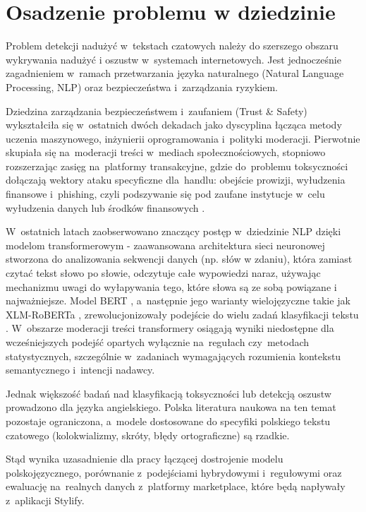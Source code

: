 \section{Osadzenie problemu w dziedzinie}

Problem detekcji nadużyć w~tekstach czatowych należy do szerszego obszaru
wykrywania nadużyć i oszustw w~systemach internetowych. Jest jednocześnie
zagadnieniem w~ramach przetwarzania języka naturalnego (Natural Language
Processing, NLP) oraz bezpieczeństwa i~zarządzania ryzykiem.

Dziedzina zarządzania bezpieczeństwem i~zaufaniem (Trust \& Safety)
wykształciła się w~ostatnich dwóch dekadach jako dyscyplina łącząca metody
uczenia maszynowego, inżynierii oprogramowania i~polityki moderacji. Pierwotnie
skupiała się na~moderacji treści w~mediach społecznościowych, stopniowo rozszerzając
zasięg na~platformy transakcyjne, gdzie do~problemu toksyczności dołączają
wektory ataku specyficzne dla~handlu: obejście prowizji, wyłudzenia finansowe
i~phishing, czyli podszywanie się pod zaufane instytucje w~celu wyłudzenia danych
lub środków finansowych \cite{bib:phishing}.

W~ostatnich latach zaobserwowano znaczący postęp w~dziedzinie NLP dzięki modelom
transformerowym - zaawansowana architektura sieci neuronowej stworzona do analizowania sekwencji danych (np. słów w zdaniu), która zamiast czytać tekst słowo po słowie, odczytuje całe wypowiedzi naraz, używając mechanizmu uwagi do wyłapywania tego, które słowa są ze sobą powiązane i najważniejsze. Model BERT \cite{bib:bert}, a~następnie jego warianty wielojęzyczne
takie jak XLM-RoBERTa \cite{bib:xlmr}, zrewolucjonizowały podejście do wielu zadań
klasyfikacji tekstu \cite{bib:transformers_survey}. W~obszarze moderacji treści
transformery osiągają wyniki niedostępne dla wcześniejszych podejść opartych
wyłącznie na~regułach czy~metodach statystycznych, szczególnie
w~zadaniach wymagających rozumienia kontekstu semantycznego i~intencji nadawcy.

Jednak większość badań nad klasyfikacją toksyczności lub detekcją
oszustw prowadzono dla języka angielskiego. Polska literatura naukowa na ten temat
pozostaje ograniczona, a~modele dostosowane do specyfiki polskiego tekstu czatowego
(kolokwializmy, skróty, błędy ortograficzne) są rzadkie.

Stąd wynika uzasadnienie dla pracy łączącej dostrojenie modelu polskojęzycznego,
porównanie z~podejściami hybrydowymi i~regułowymi oraz ewaluację na~realnych
danych z~platformy marketplace, które będą napływały z~aplikacji Stylify.

